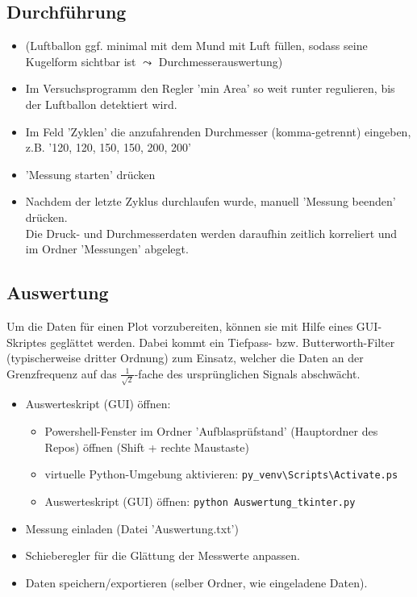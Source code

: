 \documentclass[german, 11pt]{scrartcl}
\begin{document}
\subsection{Durchführung}
\begin{itemize}
    \item (Luftballon ggf. minimal mit dem Mund mit Luft füllen, sodass seine Kugelform sichtbar ist $\leadsto$ Durchmesserauswertung)
    \item Im Versuchsprogramm den Regler 'min Area' so weit runter regulieren, bis der Luftballon detektiert wird.
    \item Im Feld 'Zyklen' die anzufahrenden Durchmesser (komma-getrennt) eingeben, z.B. '120, 120, 150, 150, 200, 200'
    \item 'Messung starten' drücken
    \item Nachdem der letzte Zyklus durchlaufen wurde, manuell 'Messung beenden' drücken.\\
    Die Druck- und Durchmesserdaten werden daraufhin zeitlich korreliert und im Ordner 'Messungen' abgelegt.
\end{itemize}

\subsection{Auswertung}
Um die Daten für einen Plot vorzubereiten, können sie mit Hilfe eines GUI-Skriptes geglättet werden.
Dabei kommt ein Tiefpass- bzw. Butterworth-Filter (typischerweise dritter Ordnung) zum Einsatz,
welcher die Daten an der Grenzfrequenz auf das $\frac{1}{\sqrt{2}}$-fache des ursprünglichen Signals abschwächt.
\begin{itemize}
    \item Auswerteskript (GUI) öffnen:
    \begin{itemize}
        \item Powershell-Fenster im Ordner 'Aufblasprüfstand' (Hauptordner des Repos) öffnen (Shift + rechte Maustaste)
        \item virtuelle Python-Umgebung aktivieren: \texttt{py\_venv\textbackslash Scripts\textbackslash Activate.ps}
        \item Auswerteskript (GUI) öffnen: \texttt{python Auswertung\_tkinter.py}
    \end{itemize}
    \item Messung einladen (Datei 'Auswertung.txt')
    \item Schieberegler für die Glättung der Messwerte anpassen.
    \item Daten speichern/exportieren (selber Ordner, wie eingeladene Daten).
\end{itemize}
\end{document}

